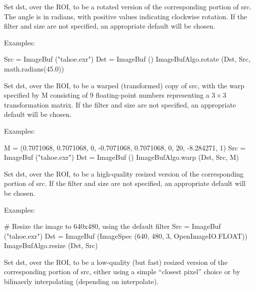Set {\cf dst}, over the ROI, to be a rotated version of the
corresponding portion of {\cf src}.  The angle is in radians, with positive
values indicating clockwise rotation. If the filter and size are not
specified, an appropriate default will be chosen.

\smallskip
\noindent Examples:
\begin{code}
    Src = ImageBuf ("tahoe.exr")
    Dst = ImageBuf ()
    ImageBufAlgo.rotate (Dst, Src, math.radians(45.0))
\end{code}
\apiend


 

Set {\cf dst}, over the ROI, to be a warped (transformed) copy of {\cf src},
with the warp specified by {\cf M} consisting of 9 floating-point numbers
representing a $3 \times 3$ transformation matrix.  If the filter and size
are not specified, an appropriate default will be chosen.

\smallskip
\noindent Examples:
\begin{code}
    M = (0.7071068, 0.7071068, 0, -0.7071068, 0.7071068, 0, 20, -8.284271, 1)
    Src = ImageBuf ("tahoe.exr")
    Dst = ImageBuf ()
    ImageBufAlgo.warp (Dst, Src, M)
\end{code}
\apiend


 
Set {\cf dst}, over the ROI, to be a high-quality resized version of the
corresponding portion of {\cf src}.  If the filter and size are not
specified, an appropriate default will be chosen.

\smallskip
\noindent Examples:
\begin{code}
    # Resize the image to 640x480, using the default filter
    Src = ImageBuf ("tahoe.exr")
    Dst = ImageBuf (ImageSpec (640, 480, 3, OpenImageIO.FLOAT))
    ImageBufAlgo.resize (Dst, Src)
\end{code}
\apiend


 
Set {\cf dst}, over the ROI, to be a low-quality (but fast) resized version
of the corresponding portion of {\cf src}, either using a simple ``closest
pixel'' choice or by bilinaerly interpolating (depending on {\cf
interpolate}).


